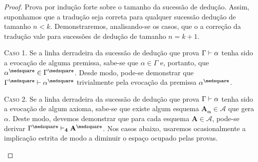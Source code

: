     \begin{proof}
        Prova por indução forte sobre o tamanho da sucessão de dedução.
        Assim, suponhamos que a tradução seja correta para qualquer sucessão dedução de tamanho $n<k$.
        Demonstraremos, analisando-se os casos, que o a correção da tradução vale para sucessões de dedução de tamanho $n=k+1$.

        \begin{case}
            \textsc{Caso 1.}
            Se a linha derradeira da sucessão de dedução que prova $\Gamma\mathrel{\vdash}\alpha$ tenha sido a evocação de alguma premissa, sabe-se que $\alpha\in\Gamma$ e, portanto, que $\alpha^\medsquare\in\Gamma^\medsquare$. Desde modo, pode-se demonstrar que $\Gamma^\medsquare\entails\alpha^\medsquare$ trivialmente pela evocação da premissa $\alpha^\medsquare$.
        \end{case}

        \begin{case}
            \textsc{Caso 2.}
            Se a linha derradeira da sucessão de dedução que prova $\Gamma\mathrel{\vdash}\alpha$ tenha sido a evocação de algum axioma, sabe-se que existe algum esquema $\mathbf{A_\alpha}\in\mathcal{A}$ que gera $\alpha$. Deste modo, devemos demonstrar que para cada esquema $\mathbf{A}\in\mathcal{A}$, pode-se derivar $\Gamma^\medsquare\entails_\mathbf{4}\mathbf{A}^\medsquare$. Nos casos abaixo, usaremos ocasionalmente a implicação estrita de modo a diminuir o espaço ocupado pelas provas.
        \end{case}


\end{proof}
